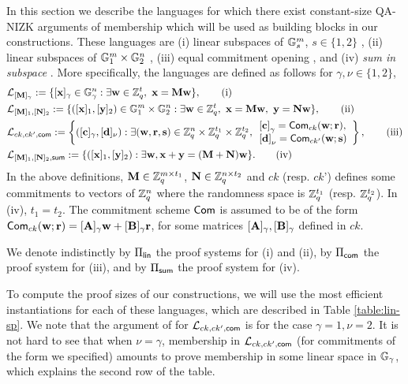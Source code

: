 In this section we describe the languages for which there exist constant-size QA-NIZK arguments of membership which will be used as building blocks in our constructions.  These languages are (i) linear subspaces of $\mathbb{G}_s^m$, $s \in \{1,2\}$ \cite{C:JutRoy14,EC:KilWee15,EC:LPJY14}, (ii) linear subspaces of $\mathbb{G}_1^m\times\mathbb{G}_2^n$ \cite{AC:GonHevRaf15}, (iii) equal commitment opening \cite{AC:GonHevRaf15}, and (iv) \emph{sum in subspace} \cite{AC:GonHevRaf15}. More specifically, the languages are defined as follows for $\gamma,\nu \in \{1,2\}$, 
\begin{align}
&\mathcal{L}_{[\mathbf{{M}}]_\gamma}:=\{ [\mathbf{x}]_{\gamma} \in \mathbb{G}_{\gamma}^{n}:  \exists \mathbf{w} \in \mathbb{Z}_q^{t}, \  \mathbf{x}=\mathbf{{M}}\mathbf{w} \}, \tag{i}\\
&\mathcal{L}_{[\mathbf{{M}}]_1,[\mathbf{{N}}]_2}:=\{ ([\mathbf{x}]_1,[\mathbf{y}]_2) \in \mathbb{G}_1^{m}\times\mathbb{G}_2^n:  \exists \mathbf{w} \in \mathbb{Z}_q^{t}, \  \mathbf{x}=\mathbf{{M}}\mathbf{w}, \   \mathbf{y}=\mathbf{{N}}\mathbf{w} \}, \tag{ii}\\
&\mathcal{L}_{ck,ck',\mathsf{com}}:=\left\{([\mathbf{c}]_\gamma,[\mathbf{d}]_\nu):\exists (\mathbf{w}, \mathbf{r},\mathbf{s}) 
\in \mathbb{Z}_q^n \times \mathbb{Z}_q^{t_1} \times \mathbb{Z}_q^{t_2},  
\begin{array}{l}
    {[\mathbf{c}]}_\gamma=\mathsf{Com}_{ck}(\mathbf{w};\mathbf{r}),\\
    {[\mathbf{d}]}_\nu=\mathsf{Com}_{ck'}(\mathbf{w};\mathbf{s})
\end{array}
\right\}, \tag{iii}\\
&\mathcal{L}_{[\mathbf{{M}}]_1,[\mathbf{{N}}]_2,\mathsf{sum}}:=\{([\mathbf{x}]_1,[\mathbf{y}]_2):\exists\mathbf{w}, \mathbf{x}+\mathbf{y}=(\mathbf{{M}}+\mathbf{{N}})\mathbf{w}\}. \tag{iv}
\end{align}
In the above definitions, $\mathbf{{M}} \in \mathbb{Z}_q^{m \times t_1}$,
  $\mathbf{{N}} \in \mathbb{Z}_q^{n \times t_2}$ and $ck$ (resp. $ck$') defines some commitments to vectors of $\mathbb{Z}_q^{n}$ where the randomness space is $\mathbb{Z}_q^{t_1}$ (resp. $\mathbb{Z}_q^{t_2}$). In (iv), $t_1=t_2$. The commitment scheme $\mathsf{Com}$ is assumed to be of the form 
 $\mathsf{Com}_{ck}(\mathbf{w};\mathbf{r})=[\mathbf{{A}}]_\gamma \mathbf{w}+[\mathbf{{B}}]_\gamma \mathbf{r}$, 
 for some matrices $[\mathbf{{A}}]_\gamma,[\mathbf{{B}}]_\gamma$ defined in 
  $ck$. 

We denote indistinctly by $\Pi_{\mathsf{lin}}$ the proof systems for (i) and (ii), by $\Pi_{\mathsf{com}}$ the proof system for (iii), and by $\Pi_{\mathsf{sum}}$ the proof system for (iv).

 To compute the proof sizes of our constructions, we will use the most efficient instantiations for each of these languages, which are described in Table \ref{table:lin-sp}. We note that the argument of \cite{AC:GonHevRaf15} for $\mathcal{L}_{ck,ck',\mathsf{com}}$ is for the case $\gamma=1,\nu=2$. It is not hard to see that when $\nu=\gamma$, membership in $\mathcal{L}_{ck,ck',\mathsf{com}}$ (for commitments of the form we specified) amounts to prove membership in some linear space in $\mathbb{G}_\gamma$, which explains the second row of the table.

